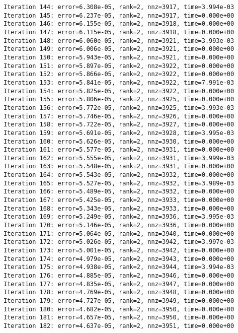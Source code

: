 \documentclass[11pt]{article}
\begin{document}
    \begin{Verbatim}[commandchars=\\\{\}]
Iteration 144: error=6.308e-05, rank=2, nnz=3917, time=3.994e-03
Iteration 145: error=6.237e-05, rank=2, nnz=3917, time=0.000e+00
Iteration 146: error=6.155e-05, rank=2, nnz=3918, time=0.000e+00
Iteration 147: error=6.115e-05, rank=2, nnz=3918, time=0.000e+00
Iteration 148: error=6.060e-05, rank=2, nnz=3921, time=3.993e-03
Iteration 149: error=6.006e-05, rank=2, nnz=3921, time=0.000e+00
Iteration 150: error=5.943e-05, rank=2, nnz=3921, time=0.000e+00
Iteration 151: error=5.897e-05, rank=2, nnz=3922, time=0.000e+00
Iteration 152: error=5.866e-05, rank=2, nnz=3922, time=0.000e+00
Iteration 153: error=5.841e-05, rank=2, nnz=3922, time=7.991e-03
Iteration 154: error=5.825e-05, rank=2, nnz=3922, time=0.000e+00
Iteration 155: error=5.806e-05, rank=2, nnz=3925, time=0.000e+00
Iteration 156: error=5.772e-05, rank=2, nnz=3925, time=3.993e-03
Iteration 157: error=5.746e-05, rank=2, nnz=3926, time=0.000e+00
Iteration 158: error=5.722e-05, rank=2, nnz=3927, time=0.000e+00
Iteration 159: error=5.691e-05, rank=2, nnz=3928, time=3.995e-03
Iteration 160: error=5.626e-05, rank=2, nnz=3930, time=0.000e+00
Iteration 161: error=5.577e-05, rank=2, nnz=3931, time=0.000e+00
Iteration 162: error=5.555e-05, rank=2, nnz=3931, time=3.999e-03
Iteration 163: error=5.548e-05, rank=2, nnz=3931, time=0.000e+00
Iteration 164: error=5.543e-05, rank=2, nnz=3932, time=0.000e+00
Iteration 165: error=5.527e-05, rank=2, nnz=3932, time=3.989e-03
Iteration 166: error=5.489e-05, rank=2, nnz=3932, time=0.000e+00
Iteration 167: error=5.425e-05, rank=2, nnz=3933, time=0.000e+00
Iteration 168: error=5.343e-05, rank=2, nnz=3933, time=0.000e+00
Iteration 169: error=5.249e-05, rank=2, nnz=3936, time=3.995e-03
Iteration 170: error=5.146e-05, rank=2, nnz=3936, time=0.000e+00
Iteration 171: error=5.064e-05, rank=2, nnz=3940, time=0.000e+00
Iteration 172: error=5.026e-05, rank=2, nnz=3942, time=3.997e-03
Iteration 173: error=5.001e-05, rank=2, nnz=3942, time=0.000e+00
Iteration 174: error=4.979e-05, rank=2, nnz=3943, time=0.000e+00
Iteration 175: error=4.938e-05, rank=2, nnz=3944, time=3.994e-03
Iteration 176: error=4.885e-05, rank=2, nnz=3946, time=0.000e+00
Iteration 177: error=4.835e-05, rank=2, nnz=3947, time=0.000e+00
Iteration 178: error=4.769e-05, rank=2, nnz=3948, time=0.000e+00
Iteration 179: error=4.727e-05, rank=2, nnz=3949, time=0.000e+00
Iteration 180: error=4.682e-05, rank=2, nnz=3950, time=0.000e+00
Iteration 181: error=4.657e-05, rank=2, nnz=3950, time=0.000e+00
Iteration 182: error=4.637e-05, rank=2, nnz=3951, time=0.000e+00

\end{Verbatim}
\end{document}
